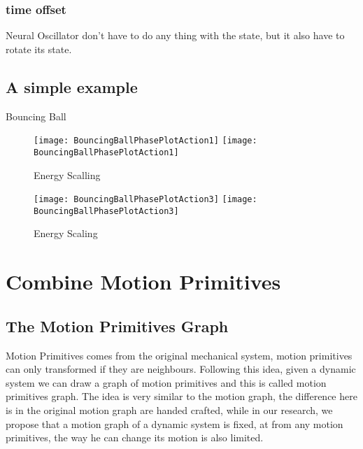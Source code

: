 \subsubsection*{time offset }
Neural Oscillator don't have to do any thing with the state,
but it also have to rotate its state.


\subsection{A simple example}

Bouncing Ball

\begin{figure}[!htbp]
  \begin{center}
    \leavevmode
    \ifpdf
      \texttt{[image: BouncingBallPhasePlotAction1]}
    \else
      \texttt{[image: BouncingBallPhasePlotAction1]}
    \fi
    \caption{Energy Scalling}
    \label{fig:energy1}
  \end{center}
\end{figure} 


\begin{figure}[!htbp]
  \begin{center}
    \leavevmode
    \ifpdf
      \texttt{[image: BouncingBallPhasePlotAction3]}
    \else
      \texttt{[image: BouncingBallPhasePlotAction3]}
    \fi
    \caption{Energy Scaling}
    \label{fig:energy3}
  \end{center}
\end{figure}

\section{Combine Motion Primitives}

\subsection{The Motion Primitives Graph}
Motion Primitives comes from the original mechanical system, motion primitives can only transformed if they are neighbours.
Following this idea, given a dynamic system we can draw a graph of motion primitives and this is called motion primitives graph.
The idea is very similar to the motion graph, the difference here is in the original motion graph are handed  crafted, 
while in our research, we propose that a motion graph of a dynamic system is fixed, at from any motion primitives, the way he can change its motion is also limited.

